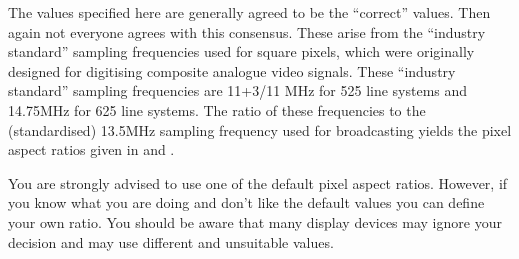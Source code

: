The values specified here are generally agreed to be the
“correct” values. Then again not everyone agrees with this
consensus. These arise from the “industry standard” sampling
frequencies used for square pixels, which were originally designed for
digitising composite analogue video signals. These “industry
standard” sampling frequencies are 11+3/11 MHz for 525 line systems
and 14.75MHz for 625 line systems. The ratio of these frequencies to the
(standardised) 13.5MHz sampling frequency used for broadcasting yields
the pixel aspect ratios given in  and .

You are strongly advised to use one of the default pixel aspect ratios.
However, if you know what you are doing and don’t like the default
values you can define your own ratio. You should be aware that many
display devices may ignore your decision and may use different and
unsuitable values. 

